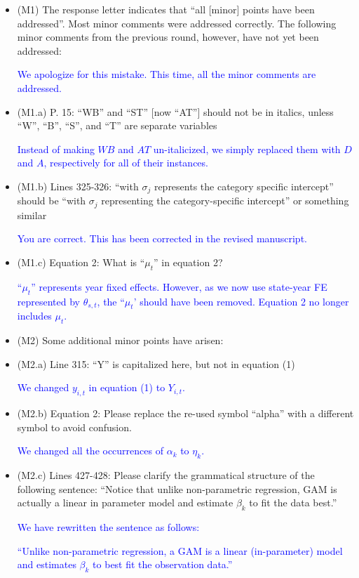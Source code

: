 \documentclass[
]{article}
\begin{document}
\begin{itemize}

\item (M1) The response letter indicates that ``all [minor] points have been addressed''. Most minor comments were addressed correctly. The following minor comments from the previous round, however, have not yet been addressed:

\textcolor{blue}{We apologize for this mistake. This time, all the minor comments are addressed.}

\item (M1.a) P. 15: ``WB'' and ``ST'' [now ``AT''] should not be in italics, unless ``W'', ``B'', ``S'', and ``T'' are separate variables

\textcolor{blue}{Instead of making $WB$ and $AT$ un-italicized, we simply replaced them with $D$ and $A$, respectively for all of their instances.}

\item (M1.b) Lines 325-326: ``with $\sigma_j$ represents the category specific intercept'' should be ``with $\sigma_j$ representing the category-specific intercept'' or something similar

\textcolor{blue}{You are correct. This has been corrected in the revised manuscript.}

\item (M1.c) Equation 2: What is ``$\mu_t$'' in equation 2?

\textcolor{blue}{``$\mu_t$'' represents year fixed effects. However, as we now use state-year FE represented by $\theta_{s,t}$, the ``$\mu_t$' should have been removed. Equation 2 no longer includes $\mu_t$.}

\item (M2) Some additional minor points have arisen:

\item (M2.a) Line 315: ``Y'' is capitalized here, but not in equation (1)

\textcolor{blue}{We changed $y_{i,t}$ in equation (1) to $Y_{i,t}$.}

\item (M2.b) Equation 2: Please replace the re-used symbol ``alpha'' with a different symbol to avoid confusion.

\textcolor{blue}{We changed all the occurrences of $\alpha_{k}$ to $\eta_{k}$.}

\item (M2.c) Lines 427-428: Please clarify the grammatical structure of the following sentence: ``Notice that unlike non-parametric regression, GAM is actually a linear in parameter model and estimate $\beta_k$ to fit the data best.''

\textcolor{blue}{We have rewritten the sentence as follows:}

\textcolor{blue}{``Unlike non-parametric regression, a GAM is a linear (in-parameter) model and estimates $\beta_k$ to best fit the observation data.''}

\end{itemize}
\end{document}
